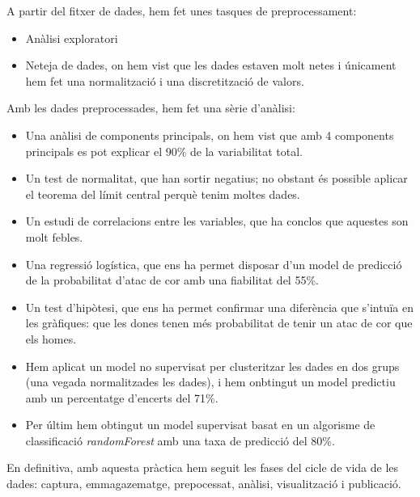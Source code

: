 \documentclass[
]{article}
\providecommand{\tightlist}{%
  \setlength{\itemsep}{0pt}\setlength{\parskip}{0pt}}
\begin{document}
A partir del fitxer de dades, hem fet unes tasques de preprocessament:

\begin{itemize}
\tightlist
\item
  Anàlisi exploratori
\item
  Neteja de dades, on hem vist que les dades estaven molt netes i
  únicament hem fet una normalització i una discretització de valors.
\end{itemize}

Amb les dades preprocessades, hem fet una sèrie d'anàlisi:

\begin{itemize}
\tightlist
\item
  Una anàlisi de components principals, on hem vist que amb 4 components
  principals es pot explicar el 90\% de la variabilitat total.
\item
  Un test de normalitat, que han sortir negatius; no obstant és possible
  aplicar el teorema del límit central perquè tenim moltes dades.
\item
  Un estudi de correlacions entre les variables, que ha conclos que
  aquestes son molt febles.
\item
  Una regressió logística, que ens ha permet disposar d'un model de
  predicció de la probabilitat d'atac de cor amb una fiabilitat del
  55\%.
\item
  Un test d'hipòtesi, que ens ha permet confirmar una diferència que
  s'intuïa en les gràfiques: que les dones tenen més probabilitat de
  tenir un atac de cor que els homes.
\item
  Hem aplicat un model no supervisat per clusteritzar les dades en dos
  grups (una vegada normalitzades les dades), i hem onbtingut un model
  predictiu amb un percentatge d'encerts del 71\%.
\item
  Per últim hem obtingut un model supervisat basat en un algorisme de
  classificació \emph{randomForest} amb una taxa de predicció del 80\%.
\end{itemize}

En definitiva, amb aquesta pràctica hem seguit les fases del cicle de
vida de les dades: captura, emmagazematge, prepocessat, anàlisi,
visualització i publicació.
\end{document}
